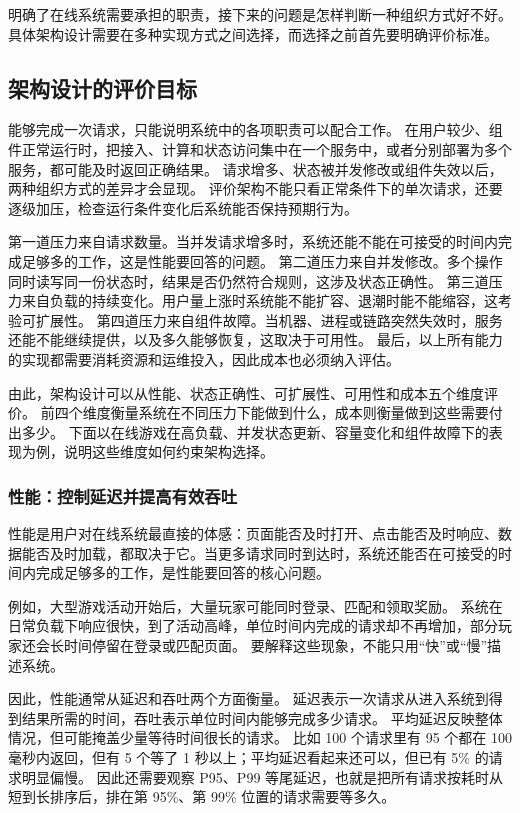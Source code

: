 明确了在线系统需要承担的职责，接下来的问题是怎样判断一种组织方式好不好。
具体架构设计需要在多种实现方式之间选择，而选择之前首先要明确评价标准。

\subsection{架构设计的评价目标}\label{sec1:architecture-goals}

能够完成一次请求，只能说明系统中的各项职责可以配合工作。
在用户较少、组件正常运行时，把接入、计算和状态访问集中在一个服务中，或者分别部署为多个服务，都可能及时返回正确结果。
请求增多、状态被并发修改或组件失效以后，两种组织方式的差异才会显现。
评价架构不能只看正常条件下的单次请求，还要逐级加压，检查运行条件变化后系统能否保持预期行为。

第一道压力来自请求数量。当并发请求增多时，系统还能不能在可接受的时间内完成足够多的工作，这是性能要回答的问题。
第二道压力来自并发修改。多个操作同时读写同一份状态时，结果是否仍然符合规则，这涉及状态正确性。
第三道压力来自负载的持续变化。用户量上涨时系统能不能扩容、退潮时能不能缩容，这考验可扩展性。
第四道压力来自组件故障。当机器、进程或链路突然失效时，服务还能不能继续提供，以及多久能够恢复，这取决于可用性。
最后，以上所有能力的实现都需要消耗资源和运维投入，因此成本也必须纳入评估。

由此，架构设计可以从性能、状态正确性、可扩展性、可用性和成本五个维度评价。
前四个维度衡量系统在不同压力下能做到什么，成本则衡量做到这些需要付出多少。
下面以在线游戏在高负载、并发状态更新、容量变化和组件故障下的表现为例，说明这些维度如何约束架构选择。

\subsubsection{性能：控制延迟并提高有效吞吐}\label{sec1:performance-goal}

性能是用户对在线系统最直接的体感：页面能否及时打开、点击能否及时响应、数据能否及时加载，都取决于它。当更多请求同时到达时，系统还能否在可接受的时间内完成足够多的工作，是性能要回答的核心问题。

例如，大型游戏活动开始后，大量玩家可能同时登录、匹配和领取奖励。
系统在日常负载下响应很快，到了活动高峰，单位时间内完成的请求却不再增加，部分玩家还会长时间停留在登录或匹配页面。
要解释这些现象，不能只用“快”或“慢”描述系统。

因此，性能通常从延迟和吞吐两个方面衡量。
延迟表示一次请求从进入系统到得到结果所需的时间，吞吐表示单位时间内能够完成多少请求。
平均延迟反映整体情况，但可能掩盖少量等待时间很长的请求。
比如 100 个请求里有 95 个都在 100 毫秒内返回，但有 5 个等了 1 秒以上；平均延迟看起来还可以，但已有 5\% 的请求明显偏慢。
因此还需要观察 P95、P99 等尾延迟，也就是把所有请求按耗时从短到长排序后，排在第 95\%、第 99\% 位置的请求需要等多久。

